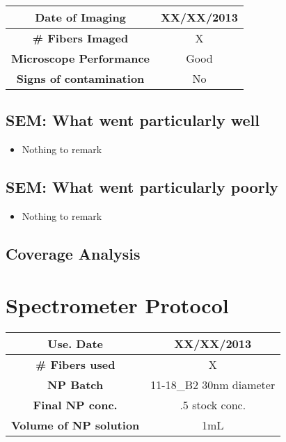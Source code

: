 \begin{center}
\begin{tabular}{| c | c |}
 \hline
 {\bf Date of Imaging} & XX/XX/2013 \\ \hline
 {\bf \# Fibers Imaged} & X \\ \hline
 {\bf Microscope Performance} & Good \\ \hline
 {\bf Signs of contamination} & No  \\ \hline
\end{tabular}
\end{center}


\subsection{SEM: {\color{blue} What went particularly well}}

\begin{itemize}
\item{Nothing to remark}
\end{itemize}

\subsection{SEM: {\color{red} What went particularly poorly}}

\begin{itemize}
\item{Nothing to remark}
\end{itemize}

\subsection{Coverage Analysis}


\section{Spectrometer Protocol}

\begin{center}
\begin{tabular}{| c | c |}
 \hline
 {\bf Use. Date} & XX/XX/2013 \\ \hline
 {\bf \# Fibers used} & X \\ \hline
 {\bf NP Batch} & 11-18\_B2 30nm diameter\footnotemark[1] \\ \hline
 {\bf Final NP conc.} & .5 stock conc.  \\ \hline
 {\bf Volume of NP solution} & 1mL \\ \hline
\end{tabular}
\end{center}

